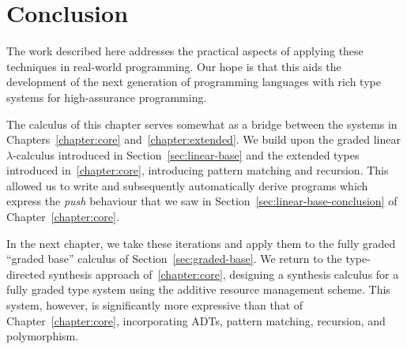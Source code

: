 \section{Conclusion}
\label{sec:der-conclusion}

The work described here addresses the practical aspects of applying these
techniques in real-world programming. Our hope is that this aids the development
of the next generation of programming languages with rich type systems for
high-assurance programming.

The calculus of this chapter serves somewhat as a bridge between the systems in
Chapters~\ref{chapter:core} and~\ref{chapter:extended}. We build upon the graded
linear $\lambda$-calculus introduced in Section~\ref{sec:linear-base} and the
extended types introduced in~\ref{chapter:core}, introducing pattern matching
and recursion. This allowed us to write and subsequently automatically derive
programs which express the \emph{push} behaviour that we saw in
Section~\ref{sec:linear-base-conclusion} of Chapter~\ref{chapter:core}. 

In the next chapter, we take these iterations and apply them to the fully graded
``graded base'' calculus of Section~\ref{sec:graded-base}. We return to the
type-directed synthesis approach of~\ref{chapter:core}, designing a synthesis
calculus for a fully graded type system using the additive resource management
scheme. This system, however, is significantly more expressive than that of
Chapter~\ref{chapter:core}, incorporating ADTs, pattern matching, recursion, and  
polymorphism. 